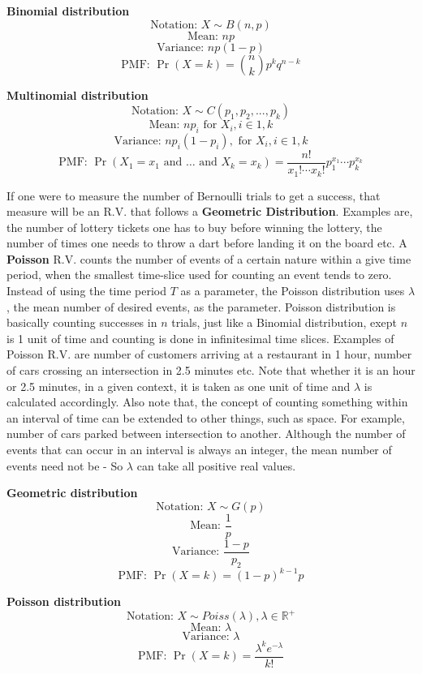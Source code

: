 	\begin{highlightedText}
		\textbf{Binomial  distribution} 
		\[ \text{Notation: }  X \sim B(n,p) \] 					
		\[ \text{Mean: } np \]  							
		\[ \text{Variance: } np(1-p) \] 						
		\[ \text{PMF: } \Pr(X=k) = \binom{n}{k} p^k q^{n-k} \] 
	 	
		\textbf{Multinomial distribution} 	
		\[ \text{Notation: } X \sim C(p_1, p_2, ..., p_k) \]	
		\[ \text{Mean: } np_i \text{ for } X_i, i \in {1,k} \]	
		\[ \text{Variance: } np_i(1-p_i), \text{ for } X_i, i \in {1,k} \]
		\[ \text{PMF: } \Pr(X_1 = x_1 \text{ and } \dots \text{ and } X_k = x_k) = \frac{n!}{x_1!\cdots x_k!} p_1^{x_1}  \cdots p_k^{x_k} \]
	\end{highlightedText}

If one were to measure the number of Bernoulli trials to get a success, that measure will be an R.V. that follows a \textbf{Geometric Distribution}. Examples are, the number of lottery tickets one has to buy before winning the lottery, the number of times one needs to throw a dart before landing it on the board etc. A \textbf{Poisson} R.V. counts the number of events of a certain nature within a give time period, when the smallest time-slice used for counting an event tends to zero. Instead of using the time period $T$ as a parameter, the Poisson distribution uses $\lambda$, the mean number of desired events, as the parameter. Poisson distribution is basically counting successes in $n$ trials, just like a Binomial distribution, exept $n$ is 1 unit of time and counting is done in infinitesimal time slices. Examples of Poisson R.V. are number of customers arriving at a restaurant in 1 hour, number of cars crossing an intersection in 2.5 minutes etc. Note that whether it is an hour or 2.5 minutes, in a given context, it is taken as one unit of time and $\lambda$ is calculated accordingly. Also note that, the concept of counting something within an interval of time can be extended to other things, such as space. For example, number of cars parked between intersection to another. Although the number of events that can occur in an interval is always an integer, the mean number of events need not be - So $\lambda$ can take all positive real values.

	\begin{highlightedText}
		\textbf{Geometric  distribution} 
		\[ \text{Notation: }  X \sim G(p) \] 					
		\[ \text{Mean: } \frac{1}{p} \] 						
		\[ \text{Variance: } \frac{1-p}{p_2} \] 						
		\[ \text{PMF: } \Pr(X=k) =  (1-p)^{k-1}p \] 
	 	
		\textbf{Poisson distribution} 	
		\[ \text{Notation: } X \sim Poiss(\lambda), \lambda \in \mathbb{R}^+ \]	
		\[ \text{Mean: } \lambda \]	
		\[ \text{Variance: } \lambda \]
		\[ \text{PMF: } \Pr(X = k) = \frac{\lambda^k e^{-\lambda}}{k!} \]
	\end{highlightedText}

